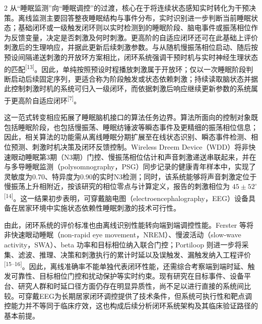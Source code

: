 \documentclass[UTF8,zihao=5,fontset=none]{ctexart}
\newcommand{\hei}{\CJKfamily{hei}}
\newcommand{\leveltwo}[1]{%
  \par\noindent{\hei\fontsize{10.5pt}{15.6pt}\selectfont\bfseries #1\par}}
\newcommand{\refcite}[1]{\nolinebreak[4]\textsuperscript{[#1]}}
\begin{document}
\begin{multicols}{2}
从“睡眠监测”向“睡眠调控”的过渡，核心在于将连续状态感知实时转化为干预决策。离线监测主要回答整夜睡眠结构与事件分布，实时识别进一步判断当前睡眠状态；基础闭环或一级触发闭环则以实时检测到的睡眠阶段、脑电事件或振荡相位作为反馈变量，决定是否刺激及何时刺激。更高阶的自适应闭环还可在此基础上评价刺激后的生理响应，并据此更新后续刺激参数。与从随机慢振荡相位启动、随后按预设间隔递送刺激的开放环方案相比，闭环系统强调干预时机与实时神经生理状态的匹配\refcite{13}。因此，单纯按照预设时程播放刺激属于开放环；仅以一次睡眠阶段判断启动后续固定序列，更适合称为阶段触发或状态依赖刺激；持续读取脑状态并据此控制刺激时机的系统可归入一级闭环，而依据刺激后响应继续更新参数的系统属于更高阶自适应闭环\refcite{7}。

这一范式转变相应拓展了睡眠脑机接口的算法任务边界。算法所面向的控制对象既包括睡眠阶段，也包括慢振荡、睡眠纺锤波等瞬态事件及更精细的振荡相位信息；因此，相关算法的功能需从离线睡眠分期扩展至在线状态识别、瞬态事件检测、相位预测、刺激时机决策及闭环反馈控制。Wireless Dreem Device（WDD）将非快速眼动睡眠第3期（N3期）门控、慢振荡相位估计和声音刺激递送串联起来，并在与多导睡眠监测（polysomnography，PSG）同步记录的健康青年样本中，实现了灵敏度为0.70、特异度为0.90的实时N3检测；同时，该系统能够将声音刺激定位于慢振荡上升相附近，按该研究的相位零点与计算定义，报告的刺激相位为 $45\pm52^{\circ}$\refcite{14}。这一结果初步表明，可穿戴脑电图（electroencephalography，EEG）设备具备在居家环境中实施状态依赖性睡眠刺激的技术可行性。

由此，闭环系统的评价标准也由离线识别性能转向端到端调控性能。Ferster 等将非快速眼动睡眠（non-rapid eye movement，NREM）、慢波活动（slow-wave activity，SWA）、beta 功率和目标相位纳入联合门控；Portiloop 则进一步将采集、滤波、推理、决策和刺激执行的累计时延以及误触发、漏触发纳入工程评价\refcite{15--16}。因此，离线准确率不能单独代表闭环性能，还需综合考察端到端时延、触发可靠性、目标相位门控和扰动保护等实时约束。现有研究在目标事件、设备平台、研究人群和时延口径方面仍存在明显异质性，尚不足以进行直接的系统间比较。可穿戴EEG为长期居家闭环调控提供了技术条件，但系统可执行性和靶点调控能力并不等同于临床疗效，这也构成后续分析闭环系统架构及其临床验证路径的基本前提。

\leveltwo{1.3 闭环睡眠干预系统的基本架构}


\end{multicols}
\end{document}
